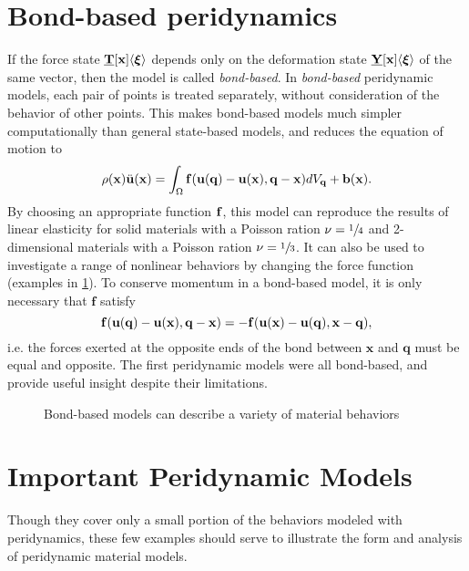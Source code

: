 \section{Bond-based peridynamics}
%
If the force state \(\vstate{T}{\mathbf{x}}{\boldsymbol{\xi}} \) depends only on the deformation state \(\vstate{Y}{\mathbf{x}}{\boldsymbol{\xi}} \)  of the same vector, then the model is called \textit{bond-based}.
In \textit{bond-based} peridynamic models, each pair of points is treated separately, without consideration of the behavior of other points. 
This makes bond-based models much simpler computationally than general state-based models, and reduces the equation of motion to
%
\begin{equation}
\label{eq:PDbondEoM}
\rho(\mathbf{x})\ddot{\mathbf{u}}(\mathbf{x}) = \int_\Omega \mathit{\mathbf{f}}(\mathbf{u}(\mathbf{q})-\mathbf{u}(\mathbf{x}),\mathbf{q}-\mathbf{x}) dV_\mathbf{q}  + \mathbf{b}(\mathbf{x}).
\end{equation}
%
By choosing an appropriate function $\mathit{\mathbf{f}}$, this model can reproduce the results of linear elasticity for solid materials with a Poisson ration \(\nu=\sfrac{1}{4}\) and 2-dimensional materials with a Poisson ration \(\nu=\sfrac{1}{3}\). 
It can also be used to investigate a range of nonlinear behaviors by changing the force function (examples in \cref{fig:BondForce}). 
To conserve momentum in a bond-based model, it is only necessary that $\mathbf{f}$ satisfy
%
\begin{equation}
\label{eq:PDbondF}
 \mathit{\mathbf{f}}(\mathbf{u}(\mathbf{q})-\mathbf{u}(\mathbf{x}),\mathbf{q}-\mathbf{x})=-\mathit{\mathbf{f}}(\mathbf{u}(\mathbf{x})-\mathbf{u}(\mathbf{q}),\mathbf{x}-\mathbf{q}),
\end{equation}
%
i.e. the forces exerted at the opposite ends of the bond between $\mathbf{x}$ and $\mathbf{q}$ must be equal and opposite.
The first peridynamic models were all bond-based, and provide useful insight  despite their limitations.
%
\begin{figure}[h]
  \centering
{}
\caption{Bond-based models can describe a variety of material behaviors}
\label{fig:BondForce}
\end{figure}
%

\section{Important Peridynamic Models}
Though they cover only a small portion of the behaviors modeled with peridynamics, these few examples should serve to illustrate the form and analysis of peridynamic material models.
